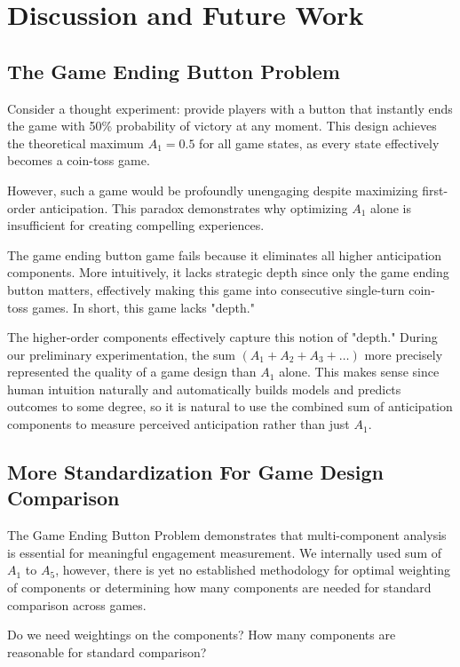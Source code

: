 \documentclass{article}
\begin{document}
\section{Discussion and Future Work}

\subsection{The Game Ending Button Problem}

Consider a thought experiment: provide players with a button that instantly ends the game with 50\% probability of victory at any moment. This design achieves the theoretical maximum $A_1 = 0.5$ for all game states, as every state effectively becomes a coin-toss game.

However, such a game would be profoundly unengaging despite maximizing first-order anticipation. This paradox demonstrates why optimizing $A_1$ alone is insufficient for creating compelling experiences.

The game ending button game fails because it eliminates all higher anticipation components. More intuitively, it lacks strategic depth since only the game ending button matters, effectively making this game into consecutive single-turn coin-toss games. In short, this game lacks "depth."

The higher-order components effectively capture this notion of "depth." During our preliminary experimentation, the sum $(A_1 + A_2 + A_3 + \ldots)$ more precisely represented the quality of a game design than $A_1$ alone.
This makes sense since human intuition naturally and automatically builds models and predicts outcomes to some degree, so it is natural to use the combined sum of anticipation components to measure perceived anticipation rather than just $A_1$.

\subsection{More Standardization For Game Design Comparison}

The Game Ending Button Problem demonstrates that multi-component analysis is essential for meaningful engagement measurement. We internally used sum of $A_1$ to $A_5$, however, there is yet no established methodology for optimal weighting of components or determining how many components are needed for standard comparison across games.

Do we need weightings on the components? How many components are reasonable for standard comparison?
\end{document}

